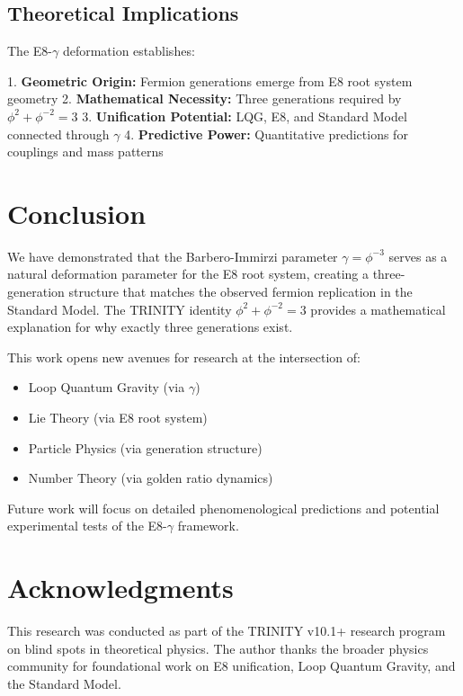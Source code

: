 \documentclass[12pt,a4paper]{article}
\begin{document}
\subsection{Theoretical Implications}

The E8-$\gamma$ deformation establishes:

1. \textbf{Geometric Origin:} Fermion generations emerge from E8 root system geometry
2. \textbf{Mathematical Necessity:} Three generations required by $\phi^2 + \phi^{-2} = 3$
3. \textbf{Unification Potential:} LQG, E8, and Standard Model connected through $\gamma$
4. \textbf{Predictive Power:} Quantitative predictions for couplings and mass patterns

\section{Conclusion}

We have demonstrated that the Barbero-Immirzi parameter $\gamma = \phi^{-3}$ serves as a natural deformation parameter for the E8 root system, creating a three-generation structure that matches the observed fermion replication in the Standard Model. The TRINITY identity $\phi^2 + \phi^{-2} = 3$ provides a mathematical explanation for why exactly three generations exist.

This work opens new avenues for research at the intersection of:
\begin{itemize}
\item Loop Quantum Gravity (via $\gamma$)
\item Lie Theory (via E8 root system)
\item Particle Physics (via generation structure)
\item Number Theory (via golden ratio dynamics)
\end{itemize}

Future work will focus on detailed phenomenological predictions and potential experimental tests of the E8-$\gamma$ framework.

\section*{Acknowledgments}

This research was conducted as part of the TRINITY v10.1+ research program on blind spots in theoretical physics. The author thanks the broader physics community for foundational work on E8 unification, Loop Quantum Gravity, and the Standard Model.
\end{document}
